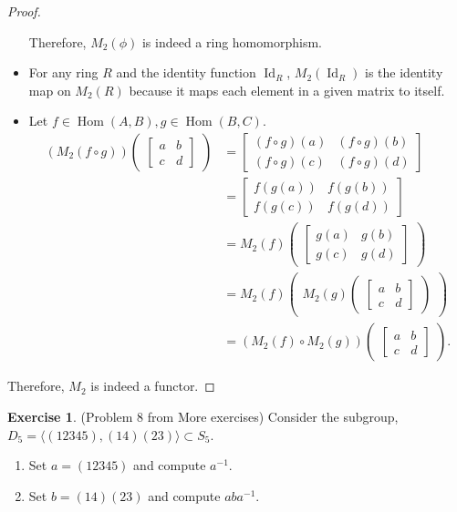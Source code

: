 \documentclass[12pt, psamsfonts]{amsart}
\theoremstyle{definition}
\newtheorem*{exer}{Exercise}
\theoremstyle{remark}
\DeclareMathOperator{\Hom}{Hom}
\DeclareMathOperator{\Id}{Id}
\numberwithin{equation}{section}
\begin{document}
\begin{proof}
\begin{itemize}
     Therefore, $M_2(\phi)$ is indeed a ring homomorphism.
   \item
     For any ring $R$ and the identity function $\Id_R$, $M_2(\Id_R)$ is the identity map on $M_2(R)$ because it maps each element in a given matrix to itself.
   \item
     Let $f \in \Hom(A, B), g \in \Hom(B, C)$.
     \begin{align*}
       (M_2(f \circ g))\begin{pmatrix}\begin{bmatrix} a & b \\ c & d \end{bmatrix}\end{pmatrix}
        &= \begin{bmatrix} (f \circ g)(a) & (f \circ g)(b) \\ (f \circ g)(c) & (f \circ g)(d) \end{bmatrix} \\
        &= \begin{bmatrix} f(g(a)) & f(g(b)) \\ f(g(c)) & f(g(d)) \end{bmatrix} \\
        &= M_2(f)\begin{pmatrix}\begin{bmatrix} g(a) & g(b) \\ g(c) & g(d) \end{bmatrix}\end{pmatrix}\\
        &= M_2(f)\begin{pmatrix}M_2(g)\begin{pmatrix}\begin{bmatrix} a & b \\ c & d \end{bmatrix}\end{pmatrix}\end{pmatrix} \\
        &= (M_2(f) \circ M_2(g))\begin{pmatrix}\begin{bmatrix} a & b \\ c & d \end{bmatrix}\end{pmatrix}.
     \end{align*}
 \end{itemize}
 Therefore, $M_2$ is indeed a functor.
\end{proof}

\begin{exer}{(Problem 8 from More exercises)}
  Consider the subgroup, $D_5 = \langle (12345), (14)(23) \rangle \subset S_5$.
  \begin{enumerate}
    \item
      Set $a = (12345)$ and compute $a^{-1}$.
    \item
      Set $b = (14)(23)$ and compute $aba^{-1}$.
  \end{enumerate}
\end{exer}
\end{document}
